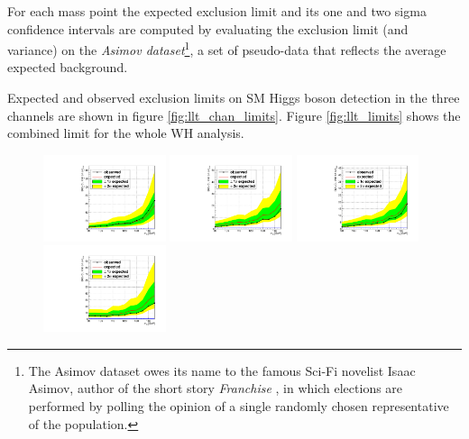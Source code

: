 For each mass point the expected exclusion limit and its one and two sigma confidence intervals are computed  by evaluating the exclusion limit (and variance) on the \emph{Asimov dataset}\footnote{The Asimov dataset owes its name to the famous Sci-Fi novelist Isaac Asimov, author of the short story \emph{Franchise} \cite{franchise}, in which elections are performed by polling the opinion of a single randomly chosen representative of the population.}, a set of pseudo-data that reflects the average expected background. 

Expected and observed exclusion limits on SM Higgs boson detection in the three channels are shown in figure \ref{fig:llt_chan_limits}. Figure \ref{fig:llt_limits} shows the combined limit for the whole WH analysis.

\begin{figure}
\begin{center}
  \includegraphics[width=0.32\textwidth]{4_Analisys/pics/limits/mmt/mmt_7TeV.pdf}
  \includegraphics[width=0.32\textwidth]{4_Analisys/pics/limits/mmt/mmt_8TeV.pdf}
  \includegraphics[width=0.32\textwidth]{4_Analisys/pics/limits/mmt/mmt.pdf} \\
  \includegraphics[width=0.32\textwidth]{4_Analisys/pics/limits/emt/emt_7TeV.pdf}

\end{center}
\end{figure}
